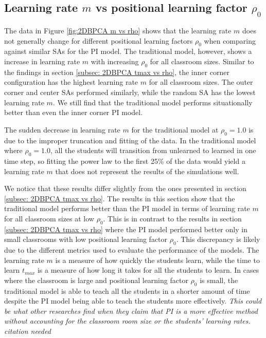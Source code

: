 \newpage

\subsection{Learning rate $m$ vs positional learning factor $\rho_0$}

The data in Figure \ref{fig:2DBPCA m vs rho} shows that the learning rate $m$ does not generally change for different positional learning factors $\rho_0$ when comparing against similar SAs for the PI model. The traditional model, however, shows a increase in learning rate $m$ with increasing $\rho_0$ for all classroom sizes. Similar to the findings in section \ref{subsec: 2DBPCA tmax vs rho}, the inner corner configuration has the highest learning rate $m$ for all classroom sizes. The outer corner and center SAs performed similarly, while the random SA has the lowest learning rate $m$. We still find that the traditional model performs situationally better than even the inner corner PI model. 

The sudden decrease in learning rate $m$ for the traditional model at $\rho_0 = 1.0$ is due to the improper truncation and fitting of the data. In the traditional model where $\rho_0 = 1.0$, all the students will transition from unlearned to learned in one time step, so fitting the power law to the first 25\% of the data would yield a learning rate $m$ that does not represent the results of the simulations well.

We notice that these results differ slightly from the ones presented in section \ref{subsec: 2DBPCA tmax vs rho}. The results in this section show that the traditional model performs better than the PI model in terms of learning rate $m$ for all classroom sizes at low $\rho_0$. This is in contrast to the results in section \ref{subsec: 2DBPCA tmax vs rho} where the PI model performed better only in small classrooms with low positional learning factor $\rho_0$. This discrepancy is likely due to the different metrics used to evaluate the performance of the models. The learning rate $m$ is a measure of how quickly the students learn, while the time to learn $t_{max}$ is a measure of how long it takes for all the students to learn. In cases where the classroom is large and positional learning factor $\rho_0$ is small, the traditional model is able to teach all the students in a shorter amount of time despite the PI model being able to teach the students more effectively. \textit{This could be what other researches find when they claim that PI is a more effective method without accounting for the classroom room size or the students' learning rates. citation needed}

